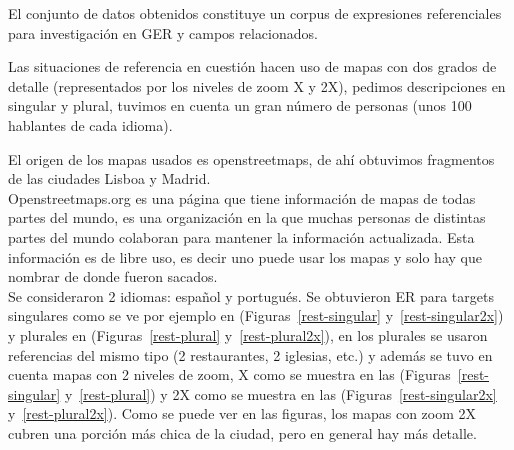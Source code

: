 El conjunto de datos obtenidos constituye un corpus de expresiones referenciales para investigaci\'on en GER y campos relacionados.

Las situaciones de referencia en cuesti\'on hacen uso de mapas con dos grados de detalle (representados por los niveles de zoom X y 2X), pedimos descripciones en singular y plural, tuvimos en cuenta un gran n\'umero de personas (unos 100 hablantes de cada idioma).


El origen de los mapas usados es openstreetmaps, de ah\'i obtuvimos fragmentos de las ciudades Lisboa y Madrid.\\

Openstreetmaps.org es una p\'agina que tiene informaci\'on de mapas de todas partes del mundo, es una organizaci\'on en la que muchas
 personas de distintas partes del mundo colaboran para mantener la informaci\'on actualizada. Esta informaci\'on es de libre uso, es decir uno puede usar los mapas y solo hay que nombrar de donde fueron sacados.\\

Se consideraron 2 idiomas: espa\~nol y portugu\'es. Se obtuvieron ER para targets singulares como se ve por ejemplo en (Figuras~\ref{rest-singular} y~\ref{rest-singular2x}) y plurales en (Figuras~\ref{rest-plural} y~\ref{rest-plural2x}), en los plurales se usaron referencias del mismo tipo (2 restaurantes, 2 iglesias, etc.) y adem\'as se tuvo en cuenta mapas con 2 niveles de zoom, X como se muestra en las (Figuras~\ref{rest-singular} y~\ref{rest-plural}) y 2X como se muestra en las (Figuras~\ref{rest-singular2x} y~\ref{rest-plural2x}). Como se puede ver en las figuras, los mapas con zoom 2X cubren una porci\'on m\'as chica de la ciudad, pero en general hay m\'as detalle.\\


